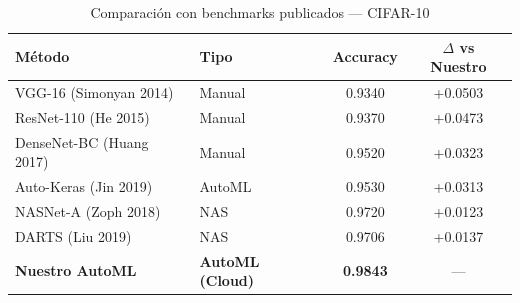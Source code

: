 \begin{table}[htbp]
\centering
\caption{Comparación con benchmarks publicados — CIFAR-10}
\label{tab:benchmark_cifar10}
\begin{tabular}{llcc}
\toprule
\textbf{Método} & \textbf{Tipo} & \textbf{Accuracy} & \textbf{$\Delta$ vs Nuestro} \\
\midrule
  VGG-16 (Simonyan 2014) & Manual & 0.9340 & +0.0503 \\
  ResNet-110 (He 2015) & Manual & 0.9370 & +0.0473 \\
  DenseNet-BC (Huang 2017) & Manual & 0.9520 & +0.0323 \\
  Auto-Keras (Jin 2019) & AutoML & 0.9530 & +0.0313 \\
  NASNet-A (Zoph 2018) & NAS & 0.9720 & +0.0123 \\
  DARTS (Liu 2019) & NAS & 0.9706 & +0.0137 \\
\midrule
  \textbf{Nuestro AutoML} & \textbf{AutoML (Cloud)} & \textbf{0.9843} & --- \\
\bottomrule
\end{tabular}
\end{table}